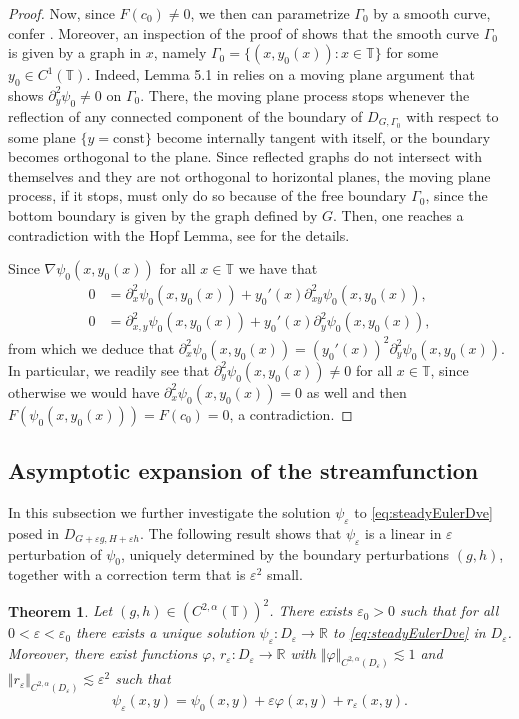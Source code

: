 \documentclass[11pt,reqno]{amsproc}
\newcommand{\R}{\mathbb{R}}
\newcommand{\ve}{\varepsilon}
\numberwithin{equation}{section}
\newtheorem{theorem}{Theorem}
\numberwithin{theorem}{section}
\numberwithin{prop}{section}
\numberwithin{cor}{section}
\numberwithin{lemma}{section}
\theoremstyle{remark}
\theoremstyle{definition}
\begin{document}
\begin{proof}
Now, since $F(c_0)\neq 0$, we then can parametrize $\Gamma_0$ by a smooth curve, confer \cite[Lemma 2.3]{drivas2024geometric}. Moreover, an inspection of the proof of \cite[Lemma 5.1]{drivas2024geometric} shows that the smooth curve $\Gamma_0$ is given by a graph in $x$, namely $\Gamma_0 = \lbrace (x,y_0(x)): x\in \mathbb{T} \rbrace$ for some $y_0\in C^1(\mathbb{T})$. Indeed, Lemma 5.1 in \cite{drivas2024geometric} relies on a moving plane argument that shows $\partial_y^2\psi_0\neq 0$ on $\Gamma_0$. There, the moving plane process stops whenever the reflection of any connected component of the boundary of $D_{G,\Gamma_0}$ with respect to some plane $\lbrace y = \text{const} \rbrace$ become internally tangent with itself, or the boundary becomes orthogonal to the plane. Since reflected graphs do not intersect with themselves and they are not orthogonal to horizontal planes, the moving plane process, if it stops, must only do so because of the free boundary $\Gamma_0$, since the bottom boundary is given by the graph defined by $G$. Then, one reaches a contradiction with the Hopf Lemma, see \cite[Lemma 5.1]{drivas2024geometric} for the details.


Since $\nabla\psi_0(x,y_0(x))$ for all $x\in \mathbb{T}$ we have that
\begin{align*}
0 &= \partial_x^2\psi_0(x,y_0(x)) + y_0'(x)\partial_{xy}^2\psi_0(x,y_0(x)), \\ 
0&=\partial_{x,y}^2\psi_0(x,y_0(x)) + y_0'(x)\partial_{y}^2\psi_0(x,y_0(x)),
\end{align*}
from which we deduce that $\partial_x^2\psi_0(x,y_0(x)) = (y_0'(x))^2\partial_y^2\psi_0(x,y_0(x))$. In particular, we readily see that $\partial_y^2\psi_0(x,y_0(x))\neq 0$ for all $x\in \mathbb{T}$, since otherwise we would have $\partial_x^2\psi_0(x,y_0(x))=0$ as well and then $F(\psi_0(x,y_0(x)))=F(c_0)=0$, a contradiction.
\end{proof}

\subsection{Asymptotic expansion of the streamfunction }In this subsection we further investigate the solution $\psi_\ve$ to \eqref{eq:steadyEulerDve} posed in $D_{G+\ve g,H+\ve h}$. The following result shows that $\psi_\ve$ is a linear in $\ve$ perturbation of $\psi_0$, uniquely determined by the boundary perturbations $(g,h)$, together with a correction term that is $\ve^2$ small.

\begin{theorem}\label{thm:defPsive}
Let $(g,h)\in (C^{2,\alpha}(\mathbb{T}))^2$. There exists $\ve_0>0$ such that for all $0<\ve<\ve_0$ there exists a unique solution $\psi_\ve:D_\ve\rightarrow \R$ to \eqref{eq:steadyEulerDve} in $D_\ve$. Moreover, there exist functions $\varphi,\,r_\ve :D_\ve\rightarrow \R$ with $\Vert {\varphi} \Vert_{C^{2,\alpha}(D_\ve)}\lesssim 1$ and $\Vert r_\ve \Vert_{C^{2,\alpha}(D_\ve)}\lesssim \ve^2$ such that
\begin{equation}\label{eq:defPsive}
\psi_\ve(x,y) = {\psi_0}(x,y) + \ve {\varphi}(x,y) + r_\ve(x,y).
\end{equation}
\end{theorem}
\end{document}

